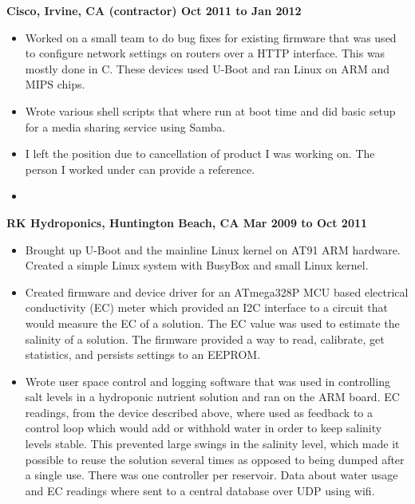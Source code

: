\documentclass{res}
\begin{document}
\begin{resume}
\begin{itemize}
          \end{itemize}

          {\large \bf Cisco, Irvine, CA (contractor) \hfill Oct 2011 to Jan 2012}

          \begin{itemize}

          \item
	    Worked on a small team to do bug fixes for existing
            firmware that was used to configure network settings on
            routers over a HTTP interface.  This was mostly done in C.
            These devices used U-Boot and ran Linux on ARM and MIPS
            chips.

          \item
	    Wrote various shell scripts that where run at boot time and did
	    basic setup for a media sharing service using Samba.

          \item
	    I left the position due to cancellation of product I was
	    working on.  The person I worked under can provide a reference.
          \item

          \end{itemize}

          {\large \bf RK Hydroponics, Huntington Beach, CA \hfill Mar 2009 to
            Oct 2011}

          \begin{itemize}

          \item
	    Brought up U-Boot and the mainline Linux kernel on AT91 ARM
	    hardware.  Created a simple Linux system with BusyBox and small
	    Linux kernel.

          \item
	    Created firmware and device driver for an ATmega328P MCU
	    based electrical conductivity (EC) meter which provided an I2C
	    interface to a circuit that would measure the EC of a solution.
	    The EC value was used to estimate the salinity of a solution.
	    The firmware provided a way to read, calibrate, get statistics,
	    and persists settings to an EEPROM.

          \item
	    Wrote user space control and logging software that was used in
	    controlling salt levels in a hydroponic nutrient solution and
	    ran on the ARM board.  EC readings, from the device described
	    above, where used as feedback to a control loop which would add
	    or withhold water in order to keep salinity levels stable.
	    This prevented large swings in the salinity level, which made
	    it possible to reuse the solution several times as opposed to
	    being dumped after a single use.  There was one controller per
	    reservoir.  Data about water usage and EC readings where sent
	    to a central database over UDP using wifi.



\end{itemize}
\end{resume}
\end{document}
